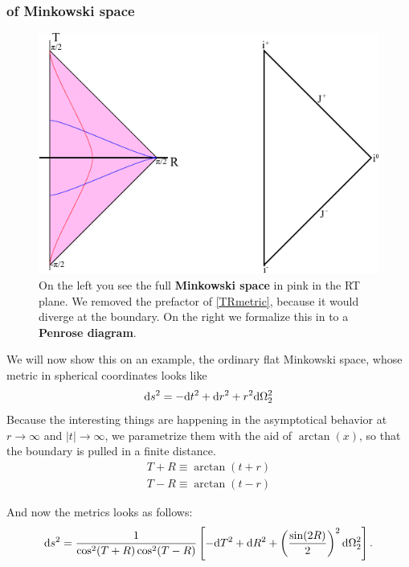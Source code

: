 	\subsubsection{of Minkowski space \checkmark}	
	\begin{figure}[tbp]	
		\begin{center}
			\includegraphics[scale=1]{flatpenrose}
		\end{center}
		\caption{On the left you see the full \textbf{Minkowski space} in pink in the RT plane. We removed the prefactor of \eqref{TRmetric}, because it would diverge at the boundary. On the right we formalize this in to a \textbf{Penrose diagram}.}\label{flatpenrose}
	\end{figure}	
	We will now show this on an example, the ordinary flat Minkowski space, whose metric in spherical coordinates looks like
		\begin{equation}
			\mathrm{d} s^2=- \mathrm{d} t^2+ \mathrm{d} r^2+r^2 \mathrm{d} \Omega^2_2
		\end{equation}
	Because the interesting things are happening in the asymptotical behavior at $r \rightarrow \infty$ and $|t| \rightarrow \infty$, we parametrize them with the aid of $\arctan(x)$, so that the boundary is pulled in a finite distance.
		\begin{equation}
		\begin{split}
			T+R\equiv\arctan(t+r) \\
			T-R\equiv\arctan(t-r)
		\end{split}
		\end{equation}
	
	And now the metrics looks as follows:
		\begin{equation} \label{TRmetric}
			\mathrm{d} s^2=
			\frac{1}{\cos^2(T+R)\cos^2(T-R)}
			\left[- \mathrm{d} T^2+ \mathrm{d} R^2+\left(\frac{\sin(2R)}{2}\right)^2 \mathrm{d} \Omega^2_2 \right].
		\end{equation}	

